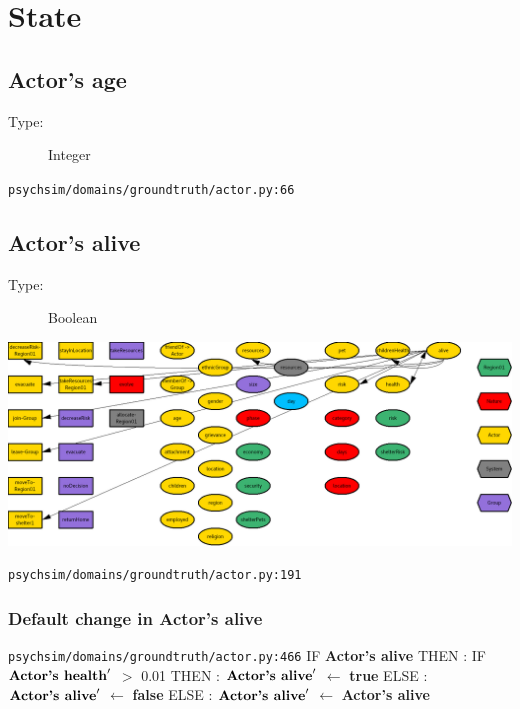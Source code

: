 \documentclass{article}%
\begin{document}
%
\section{State}%
\label{sec:State}%
\subsection{Actor's age}%
\label{subsec:Actor's age}%
\begin{description}%
\item[Type:]%
Integer%
\end{description}%
\begin{flushleft}%
\verb|psychsim/domains/groundtruth/actor.py:66|%
\end{flushleft}

%
\subsection{Actor's alive}%
\label{subsec:Actor's alive}%
\begin{description}%
\item[Type:]%
Boolean%
\end{description}%
\includegraphics[width=\textwidth]{images/aliveOfActor.png}%
\begin{flushleft}%
\verb|psychsim/domains/groundtruth/actor.py:191|%
\end{flushleft}%
\subsubsection{Default change in Actor's alive}%
\label{ssubsec:Default change in Actor's alive}%
\begin{flushleft}%
\verb|psychsim/domains/groundtruth/actor.py:466|%
\linebreak%
IF %
\textbf{Actor's alive}%
\linebreak%
\hspace*{2em}%
THEN %
: %
IF %
$\mbox{\textbf{Actor's health}} '$%
$>$%
0.01%
\linebreak%
\hspace*{4em}%
THEN %
: %
$\mbox{\textbf{Actor's alive}} '$%
$\leftarrow$%
\textbf{true}%
\linebreak%
\hspace*{4em}%
ELSE %
: %
$\mbox{\textbf{Actor's alive}} '$%
$\leftarrow$%
\textbf{false}%
\linebreak%
\hspace*{2em}%
ELSE %
: %
$\mbox{\textbf{Actor's alive}} '$%
$\leftarrow$%
\textbf{Actor's alive}%
\end{flushleft}
\end{document}
